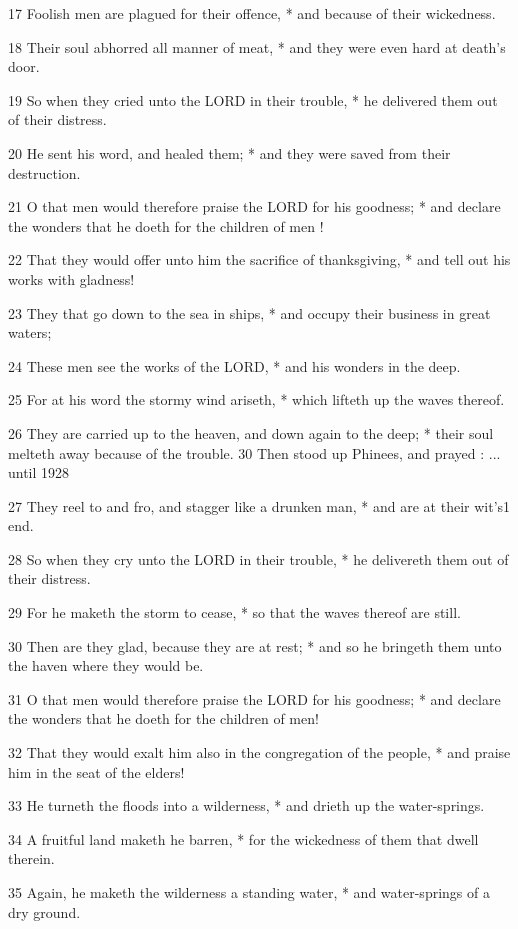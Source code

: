 17 Foolish men are plagued
for their offence, * and because of their wickedness.

18 Their soul abhorred all manner of meat, * and they
were even hard at death's door.

19 So when they cried unto the LORD
in their trouble, * he delivered them out of their distress.

20 He sent his word, and healed them; * and they were
saved from their destruction.

21 O that men would therefore praise the LORD
for his goodness; * and declare the wonders that he doeth for the children
of men !

22 That they would offer unto him the sacrifice of
thanksgiving, * and tell out his works with gladness!

23 They that go down to the sea in ships, * and occupy
their business in great waters;

24 These men see the works of the LORD,
* and his wonders in the deep.

25 For at his word the stormy wind ariseth, * which
lifteth up the waves thereof.

26 They are carried up to the heaven, and down again
to the deep; * their soul melteth away because of the trouble. 30 Then stood up Phinees,
and prayed : ...
until 1928

27 They reel to and fro, and stagger like a drunken man, * and are at
their wit's1 end.

28 So when they cry unto the LORD
in their trouble, * he delivereth them out of their distress.

29 For he maketh the storm to cease, * so that the
waves thereof are still.

30 Then are they glad, because they are at rest; *
and so he bringeth them unto the haven where they would be.

31 O that men would therefore praise the LORD
for his goodness; * and declare the wonders that he doeth for the children
of men!

32 That they would exalt him also in the congregation
of the people, * and praise him in the seat of the elders!

33
He turneth the floods into a wilderness, * and drieth up the water-springs.

34 A fruitful land maketh he barren, * for the wickedness
of them that dwell therein.

35 Again, he maketh the wilderness a standing water,
* and water-springs of a dry ground.

